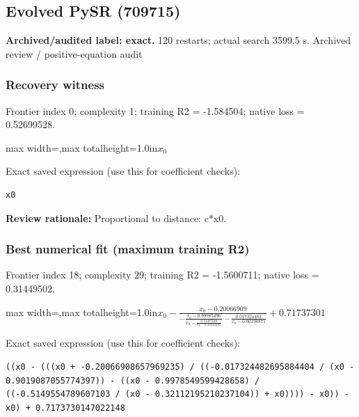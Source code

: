 \documentclass[10pt,letterpaper,landscape]{article}
\begin{document}
\begin{minipage}[t]{0.485\textwidth}
\subsection*{Evolved PySR (709715)}
\textbf{Archived/audited label: exact.} 120 restarts; actual search 3599.5 s.
{\small Archived review / positive-equation audit}
\subsubsection*{Recovery witness}
Frontier index 0; complexity 1; training R2 = -1.584504; native loss = 0.52699528.
\begin{center}\begin{adjustbox}{max width=\linewidth,max totalheight=1.0in}$\displaystyle x_{0}$\end{adjustbox}\end{center}
{\scriptsize Exact saved expression (use this for coefficient checks):}
\begin{lstlisting}
x0
\end{lstlisting}
{\small\textbf{Review rationale:} Proportional to distance: c*x0.}
\subsubsection*{Best numerical fit (maximum training R2)}
Frontier index 18; complexity 29; training R2 = -1.5600711; native loss = 0.31449502.
\begin{center}\begin{adjustbox}{max width=\linewidth,max totalheight=1.0in}$\displaystyle x_{0} - \frac{x_{0} - 0.20066909}{- \frac{x_{0} - 0.99785496}{x_{0} - \frac{0.51495548}{x_{0} - 0.32112195}} - \frac{0.017324483}{x_{0} - 0.90190871}} + 0.71737301$\end{adjustbox}\end{center}
{\scriptsize Exact saved expression (use this for coefficient checks):}
\begin{lstlisting}
((x0 - (((x0 + -0.20066908657969235) / ((-0.017324482695884404 / (x0 - 0.9019087055774397)) - ((x0 - 0.9978549599428658) / ((-0.5149554789607103 / (x0 - 0.32112195210237104)) + x0)))) - x0)) - x0) + 0.7173730147022148
\end{lstlisting}
\end{minipage}
\clearpage{}\label{hubble-10006}
\end{document}
